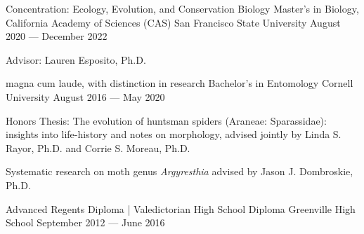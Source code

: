 

\begin{cventries}

  \cventry
    {Concentration: Ecology, Evolution, and Conservation Biology} %
    {Master's in Biology, California Academy of Sciences (CAS)} %
    {San Francisco State University} %
    {August 2020 — December 2022} %
    {
      \begin{cvitems} %
        \item {Advisor: Lauren Esposito, Ph.D.}
      \end{cvitems}
    }
  
  \cventry
    {magna cum laude, with distinction in research} %
    {Bachelor's in Entomology} %
    {Cornell University} %
    {August 2016 — May 2020} %
    {
      \begin{cvitems} %
        \item {Honors Thesis: The evolution of huntsman spiders (Araneae: Sparassidae): insights into life-history and notes on morphology, advised jointly by Linda S. Rayor, Ph.D. and Corrie S. Moreau, Ph.D.}
        \item {Systematic research on moth genus \emph{Argyresthia} advised by Jason J. Dombroskie, Ph.D.}
      \end{cvitems}
    }
  
  \cventry
    {Advanced Regents Diploma | Valedictorian} %
    {High School Diploma} %
    {Greenville High School} %
    {September 2012 — June 2016} %
    {}
\end{cventries}
